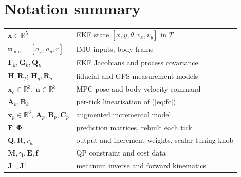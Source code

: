 \documentclass[11pt,a4paper]{article}
\newcommand{\vect}[1]{\bm{#1}}
\newcommand{\mat}[1]{\bm{#1}}
\newcommand{\Real}{\mathbb{R}}
\newcommand{\Qbar}{\bar{\mat{Q}}}
\newcommand{\Rbar}{\bar{\mat{R}}}
\begin{document}
\section{Notation summary}
\begin{center}
\small
\begin{tabular}{ll}
\toprule
$\vect x\in\Real^5$ & EKF state $[x,y,\theta,v_x,v_y]$ in $T$ \\
$\vect u_{\mathrm{imu}}=[a_x,a_y,r]$ & IMU inputs, body frame \\
$\mat F_k,\mat G_k,\mat Q_k$ & EKF Jacobians and process covariance \\
$\mat H,\mat R_f$; $\mat H_g,\mat R_g$ & fiducial and GPS measurement models \\
$\vect x_c\in\Real^3$, $\vect u\in\Real^3$ & MPC pose and body-velocity command \\
$\mat A_k,\mat B_k$ & per-tick linearisation of (\ref{eq:fc}) \\
$\vect x_p\in\Real^6$, $\mat A_p,\mat B_p,\mat C_p$ & augmented incremental model \\
$\mat F,\mat\Phi$ & prediction matrices, rebuilt each tick \\
$\Qbar,\Rbar,r_w$ & output and increment weights, scalar tuning knob \\
$\mat M,\vect\gamma,\mat E,\vect f$ & QP constraint and cost data \\
$\mat J^{-},\mat J^{+}$ & mecanum inverse and forward kinematics \\
\bottomrule
\end{tabular}
\end{center}
\end{document}
